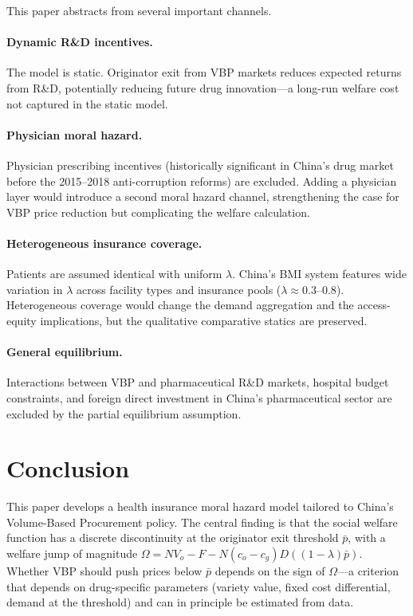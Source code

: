 \documentclass[12pt]{article}
\theoremstyle{plain}
\theoremstyle{definition}
\theoremstyle{remark}
\newcommand{\pbar}{\bar{p}}
\newcommand{\1}{\mathbf{1}}
\begin{document}
This paper abstracts from several important channels.

\paragraph{Dynamic R\&D incentives.} The model is static. Originator exit from VBP markets reduces expected returns from R\&D, potentially reducing future drug innovation---a long-run welfare cost not captured in the static model.

\paragraph{Physician moral hazard.} Physician prescribing incentives (historically significant in China's drug market before the 2015--2018 anti-corruption reforms) are excluded. Adding a physician layer would introduce a second moral hazard channel, strengthening the case for VBP price reduction but complicating the welfare calculation.

\paragraph{Heterogeneous insurance coverage.} Patients are assumed identical with uniform $\lambda$. China's BMI system features wide variation in $\lambda$ across facility types and insurance pools ($\lambda \approx 0.3$--$0.8$). Heterogeneous coverage would change the demand aggregation and the access-equity implications, but the qualitative comparative statics are preserved.

\paragraph{General equilibrium.} Interactions between VBP and pharmaceutical R\&D markets, hospital budget constraints, and foreign direct investment in China's pharmaceutical sector are excluded by the partial equilibrium assumption.

\section{Conclusion}
\label{sec:conclusion}

This paper develops a health insurance moral hazard model tailored to China's Volume-Based Procurement policy. The central finding is that the social welfare function has a discrete discontinuity at the originator exit threshold $\pbar$, with a welfare jump of magnitude $\Omega = NV_o - F - N(c_o-c_g)D((1-\lambda)\pbar)$. Whether VBP should push prices below $\pbar$ depends on the sign of $\Omega$---a criterion that depends on drug-specific parameters (variety value, fixed cost differential, demand at the threshold) and can in principle be estimated from data.
\end{document}
